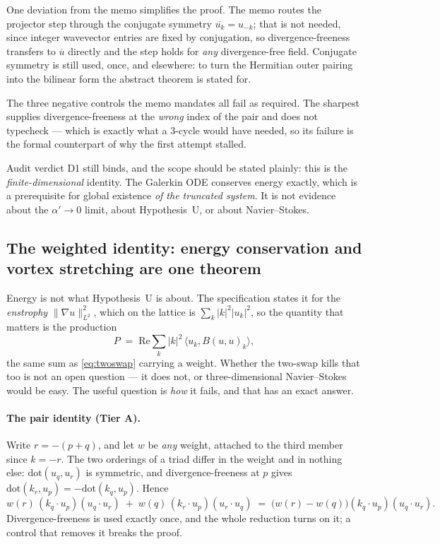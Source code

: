 \documentclass[11pt,a4paper]{article}
\newcommand{\tA}{\textcolor{TierA}{\textbf{Tier A}}}
\theoremstyle{definition}
\theoremstyle{plain}
\begin{document}
One deviation from the memo simplifies the proof. The memo routes the projector step through the
conjugate symmetry $\overline{u_k}=u_{-k}$; that is not needed, since integer wavevector entries are
fixed by conjugation, so divergence-freeness transfers to $\overline u$ directly and the step holds
for \emph{any} divergence-free field. Conjugate symmetry is still used, once, and elsewhere: to turn
the Hermitian outer pairing into the bilinear form the abstract theorem is stated for.

The three negative controls the memo mandates all fail as required. The sharpest supplies
divergence-freeness at the \emph{wrong} index of the pair and does not typecheck --- which is
exactly what a 3-cycle would have needed, so its failure is the formal counterpart of why the first
attempt stalled.

Audit verdict D1 still binds, and the scope should be stated plainly: this is the
\emph{finite-dimensional} identity. The Galerkin ODE conserves energy exactly, which is a
prerequisite for global existence \emph{of the truncated system}. It is not evidence about the
$\alpha'\to0$ limit, about Hypothesis~U, or about Navier--Stokes.

\subsection{The weighted identity: energy conservation and vortex stretching are one theorem}
\label{sec:weighted}

Energy is not what Hypothesis~U is about. The specification states it for the \emph{enstrophy}
$\|\nabla u\|_{L^2}^2$, which on the lattice is $\sum_k|k|^2|u_k|^2$, so the quantity that matters is
the production
\[
  P \;=\; \mathrm{Re}\sum_k |k|^2\,\langle u_k, B(u,u)_k\rangle ,
\]
the same sum as \eqref{eq:twoswap} carrying a weight. Whether the two-swap kills that too is not an
open question --- it does not, or three-dimensional Navier--Stokes would be easy. The useful
question is \emph{how} it fails, and that has an exact answer.

\paragraph{The pair identity (\tA{}).}
Write $r=-(p+q)$, and let $w$ be \emph{any} weight, attached to the third member since $k=-r$. The
two orderings of a triad differ in the weight and in nothing else: $\mathrm{dot}(u_q,u_r)$ is
symmetric, and divergence-freeness at $p$ gives $\mathrm{dot}(k_r,u_p)=-\mathrm{dot}(k_q,u_p)$.
Hence
\begin{equation}
  w(r)\,(k_q\!\cdot\! u_p)(u_q\!\cdot\! u_r) \;+\; w(q)\,(k_r\!\cdot\! u_p)(u_r\!\cdot\! u_q)
    \;=\; \bigl(w(r)-w(q)\bigr)(k_q\!\cdot\! u_p)(u_q\!\cdot\! u_r).
  \label{eq:weighted}
\end{equation}
Divergence-freeness is used exactly once, and the whole reduction turns on it; a control that
removes it breaks the proof.
\end{document}
